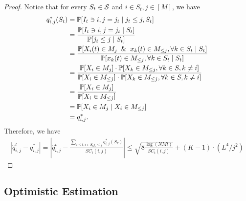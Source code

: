 \begin{lemma}
\begin{proof}
Notice that for every $S_t \in {\mathcal{S}}$ and $i \in S_t, j \in [M]$, we have
\begin{align*}
    q_{i,j}^*(S_t) &=
    \Prob[I_t \ni i, j = j_t \mid j_t \le j, S_t] \\
    &= \frac{\Prob[I_t \ni i, j = j_t \mid S_t]}{\Prob[j_t \le j \mid S_t]} \\
    &= \frac{\Prob[X_i(t) \in M_{j} \And x_k(t) \in M_{\le j}, \forall k \in S_t \mid S_t]}{\Prob[x_k(t) \in M_{\le j}, \forall k \in S_t \mid S_t]} \\
    &= \frac{\Prob[X_i \in M_j]\cdot \Prob[X_k \in M_{\le j}, \forall k \in S, k \neq i]}{\Prob[X_i \in M_{\le j}] \cdot \Prob[X_k \in M_{\le j}, \forall k \in S, k \neq i]} \\
    &= \frac{\Prob[X_i \in M_j]}{\Prob[X_i \in M_{\le j}]} \\
    &= \Prob[X_i \in M_j \mid X_i \in M_{\le j}]\\
    &= q_{i,j}^*.
\end{align*}
Therefore, we have 
\begin{align*}
    \left|\hat q_{i,j}^t - q^*_{i,j}\right| = \left|\hat q_{i,j}^t - \frac{\sum_{\tau \le t, i \in S_\tau j_\tau \le j}q_{i,j}^*(S_\tau)}{SC_t(i,j)}\right| \le \sqrt{8\frac{\log(NMt)}{SC_t(i,j)}} + (K-1)\cdot(L^4/j^2)
\end{align*}
\end{proof}
\end{lemma}

\subsection{Optimistic Estimation}

